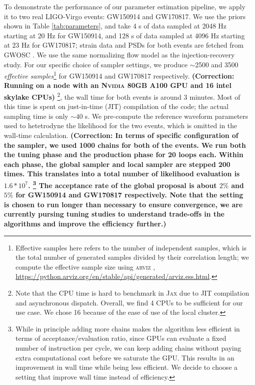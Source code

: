 \documentclass[twocolumn]{aastex631}
\newcommand{\corr}[1]{\textbf{\color{pyRed}(Correction: #1)}}
\begin{document}
To demonstrate the performance of our parameter estimation pipeline, we apply it
to two real LIGO-Virgo events: GW150914 and GW170817. We use the priors shown in
Table \ref{tab:parameters}, and take 4 s of data sampled at 2048 Hz starting at
20 Hz for GW150914, and 128 s of data sampled at 4096 Hz starting at 23 Hz for
GW170817; strain data and PSDs for both events are fetched from GWOSC
\citep{GWOSC}. We use the same normalizing flow model as the injection-recovery
study. For our specific choice of sampler settings, we produce ${\sim}$2500 and
3500 \emph{effective samples}\footnote{Effective samples here refers to the
number of independent samples, which is the total number of generated samples
divided by their correlation length; we compute the effective sample size using
\textsc{arviz} \citep{arviz_2019},
\url{https://python.arviz.org/en/stable/api/generated/arviz.ess.html}. } for
GW150914 and GW170817 respectively. \corr{Running on a node with an
\textsc{Nvidia} 80GB A100 GPU and 16 intel skylake CPUs} \footnote{Note that the
CPU time is hard to benchmark in \textsc{Jax} due to JIT compilation and
asynchronous dispatch. Overall, we find 4 CPUs to be sufficient for our use
case. We chose 16 because of the ease of use of the local cluster.}, the wall
time for both events is around 3 minutes. Most of this time is spent on
just-in-time (JIT) compilation of the code; the actual sampling time is only
${\sim}40$ s. We pre-compute the reference waveform parameters used to
hetetrodyne the likelihood for the two events, which is omitted in the wall-time
calculation. \corr{In terms of specific configuration of the sampler, we used
1000 chains for both of the events. We run both the tuning phase and the
production phase for 20 loops each. Within each phase, the global sampler and
local sampler are stepped 200 times. This translates into a total number of
likelihood evaluation is $1.6*10^7$. \footnote{While in principle adding more
chains makes the algorithm less efficient in terms of acceptance/evaluation
ratio, since GPUs can evaluate a fixed number of instruction per cycle, we can
keep adding chains without paying extra computational cost before we saturate
the GPU. This results in an improvement in wall time while being less efficient.
We decide to choose a setting that improve wall time instead of efficiency.} The
acceptance rate of the global proposal is about $2\%$ and $5\%$ for GW150914 and
GW170817 respectively. Note that the setting is chosen to run longer than
necessary to ensure convergence, we are currently pursing tuning studies to
understand trade-offs in the algorithms and improve the efficiency further.}
\end{document}
